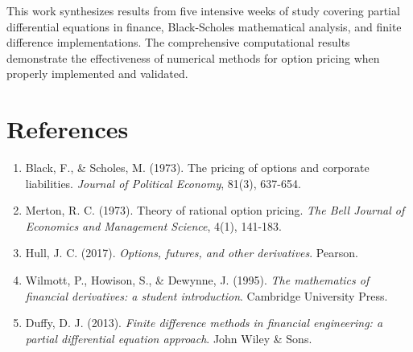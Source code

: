 \documentclass[12pt,a4paper]{article}
\numberwithin{algorithm}{subsection}
\begin{document}
This work synthesizes results from five intensive weeks of study covering partial differential equations in finance, Black-Scholes mathematical analysis, and finite difference implementations. The comprehensive computational results demonstrate the effectiveness of numerical methods for option pricing when properly implemented and validated.

\section*{References}

\begin{enumerate}
\item Black, F., \& Scholes, M. (1973). The pricing of options and corporate liabilities. \textit{Journal of Political Economy}, 81(3), 637-654.
\item Merton, R. C. (1973). Theory of rational option pricing. \textit{The Bell Journal of Economics and Management Science}, 4(1), 141-183.
\item Hull, J. C. (2017). \textit{Options, futures, and other derivatives}. Pearson.
\item Wilmott, P., Howison, S., \& Dewynne, J. (1995). \textit{The mathematics of financial derivatives: a student introduction}. Cambridge University Press.
\item Duffy, D. J. (2013). \textit{Finite difference methods in financial engineering: a partial differential equation approach}. John Wiley \& Sons.
\end{enumerate}
\end{document}
